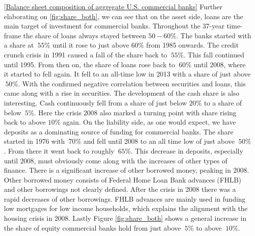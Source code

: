 \documentclass[12pt, a4paper]{article} %
\begin{document}
\ref{Balance sheet composition of aggregate U.S. commercial banks}
Further elaborating on \ref{fig:share_both}, we can see that on the asset side, loans are the main target of investment for commercial banks. Throughout the 37-year time-frame the share of loans always stayed between $50-60\%$. The banks started with a share at $~55\%$ until it rose to just above $60\%$ from 1985 onwards. The credit crunch crisis in 1991 caused a fall of the share back to $~55\%$. This fall continued until 1995. From then on, the share of loans rose back to $~60\%$ until 2008, where it started to fell again. It fell to an all-time low in 2013 with a share of just above $~50\%$. With the confirmed negative correlation between securities and loans, this came along with a rise in securities. 
The development of the cash share is also interesting. Cash continuously fell from a share of just below $20\%$ to a share of below $~5\%$. Here the crisis 2008 also marked a turning point with share rising back to above $10\%$ again. 
On the liability side, as one would expect, we have deposits as a dominating source of funding for commercial banks. The share started in 1976 with $~70\%$ and fell until 2008 to an all time low of just above $~50\%$. From there it went back to roughly $~65\%$. This decrease in deposits, especially until 2008, must obviously come along with the increases of other types of finance. There is a significant increase of other borrowed money, peaking in 2008. Other borrowed money consists of Federal Home Loan Bank advances (FHLB) and other borrowings not clearly defined. After the crisis in 2008 there was a rapid decreases of other borrowings. FHLB advances are mainly used in funding low mortgages for low income households, which explains the alignment with the housing crisis in 2008.  Lastly Figure \ref{fig:share_both} shows a general increase in the share of equity commercial banks hold from just above $~5\%$ to above $~10\%$. 
 

\end{document}
